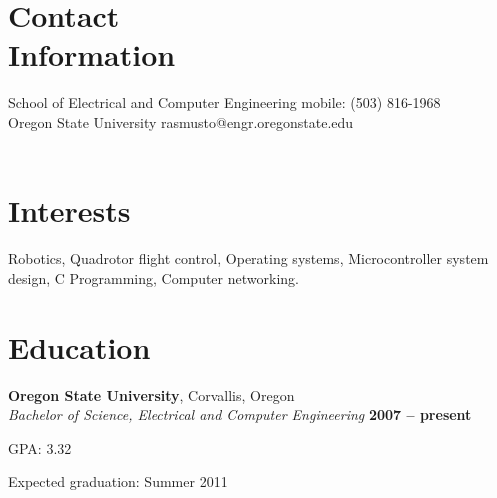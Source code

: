 \documentclass[margin,line]{resume}
\begin{document}
\begin{resume}

    \section{\mysidestyle Contact\\Information}
    School of Electrical and Computer Engineering           \hfill mobile: (503) 816-1968           \vspace{0mm}\\\vspace{0mm}
    Oregon State University                                 \hfill rasmusto@engr.oregonstate.edu    \vspace{0mm}\\\vspace{-4.5mm}\\

    \section{\mysidestyle Interests}

    Robotics, Quadrotor flight control, Operating systems, Microcontroller system\\
    design, C Programming, Computer networking.\\

    \section{\mysidestyle Education}

    \textbf{Oregon State University}, Corvallis, Oregon               \vspace{2mm}\\\vspace{1mm}%
    \textsl{Bachelor of Science, Electrical and Computer Engineering} \hfill \textbf{ 2007 -- present}\vspace{-3mm}\\\vspace{-1mm}%
    \begin{list2}
    \item GPA: 3.32
    \item Expected graduation: Summer 2011\\
    \end{list2}\vspace{-1.5mm}


\end{resume}
\end{document}
